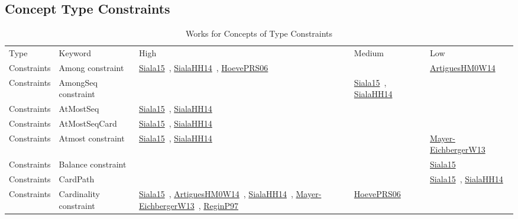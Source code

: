 \clearpage
\subsection{Concept Type Constraints}
\label{sec:Constraints}
{\scriptsize
\begin{longtable}{lp{3cm}>{\raggedright\arraybackslash}p{6cm}>{\raggedright\arraybackslash}p{6cm}>{\raggedright\arraybackslash}p{8cm}}
\rowcolor{white}\caption{Works for Concepts of Type Constraints}\\ \toprule
\rowcolor{white}Type & Keyword & High & Medium & Low\\ \midrule\endhead
\bottomrule
\endfoot
Constraints & Among constraint & \href{../cars/works/Siala15.pdf}{Siala15}~\cite{Siala15}, \href{../cars/works/SialaHH14.pdf}{SialaHH14}~\cite{SialaHH14}, \href{../cars/works/HoevePRS06.pdf}{HoevePRS06}~\cite{HoevePRS06} &  & \href{../cars/works/ArtiguesHM0W14.pdf}{ArtiguesHM0W14}~\cite{ArtiguesHM0W14}\\
Constraints & AmongSeq constraint &  & \href{../cars/works/Siala15.pdf}{Siala15}~\cite{Siala15}, \href{../cars/works/SialaHH14.pdf}{SialaHH14}~\cite{SialaHH14} & \\
Constraints & AtMostSeq & \href{../cars/works/Siala15.pdf}{Siala15}~\cite{Siala15}, \href{../cars/works/SialaHH14.pdf}{SialaHH14}~\cite{SialaHH14} &  & \\
Constraints & AtMostSeqCard & \href{../cars/works/Siala15.pdf}{Siala15}~\cite{Siala15}, \href{../cars/works/SialaHH14.pdf}{SialaHH14}~\cite{SialaHH14} &  & \\
Constraints & Atmost constraint & \href{../cars/works/Siala15.pdf}{Siala15}~\cite{Siala15}, \href{../cars/works/SialaHH14.pdf}{SialaHH14}~\cite{SialaHH14} &  & \href{../cars/works/Mayer-EichbergerW13.pdf}{Mayer-EichbergerW13}~\cite{Mayer-EichbergerW13}\\
Constraints & Balance constraint &  &  & \href{../cars/works/Siala15.pdf}{Siala15}~\cite{Siala15}\\
Constraints & CardPath &  &  & \href{../cars/works/Siala15.pdf}{Siala15}~\cite{Siala15}, \href{../cars/works/SialaHH14.pdf}{SialaHH14}~\cite{SialaHH14}\\
Constraints & Cardinality constraint & \href{../cars/works/Siala15.pdf}{Siala15}~\cite{Siala15}, \href{../cars/works/ArtiguesHM0W14.pdf}{ArtiguesHM0W14}~\cite{ArtiguesHM0W14}, \href{../cars/works/SialaHH14.pdf}{SialaHH14}~\cite{SialaHH14}, \href{../cars/works/Mayer-EichbergerW13.pdf}{Mayer-EichbergerW13}~\cite{Mayer-EichbergerW13}, \href{../cars/works/ReginP97.pdf}{ReginP97}~\cite{ReginP97} & \href{../cars/works/HoevePRS06.pdf}{HoevePRS06}~\cite{HoevePRS06} & \\

\end{longtable}}
